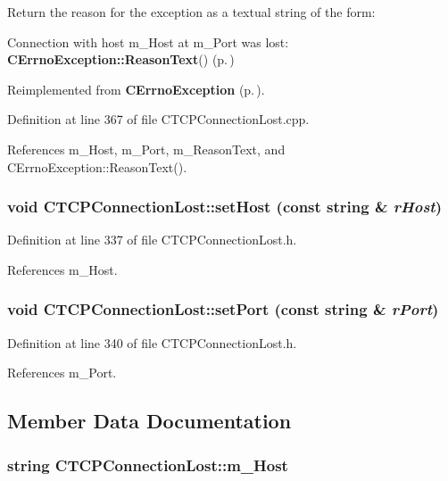 Return the reason for the exception as a textual string of the form:

Connection with host m\_\-Host at m\_\-Port was lost: {\bf CErrno\-Exception::Reason\-Text}() {\rm (p.\,\pageref{classCErrnoException_a7})} 

Reimplemented from {\bf CErrno\-Exception} {\rm (p.\,\pageref{classCErrnoException_a7})}.

Definition at line 367 of file CTCPConnection\-Lost.cpp.

References m\_\-Host, m\_\-Port, m\_\-Reason\-Text, and CErrno\-Exception::Reason\-Text().
\subsubsection{\setlength{\rightskip}{0pt plus 5cm}void CTCPConnection\-Lost::set\-Host (const string \& {\em r\-Host})\hspace{0.3cm}{\tt  [inline, protected]}}\label{classCTCPConnectionLost_b0}




Definition at line 337 of file CTCPConnection\-Lost.h.

References m\_\-Host.
\subsubsection{\setlength{\rightskip}{0pt plus 5cm}void CTCPConnection\-Lost::set\-Port (const string \& {\em r\-Port})\hspace{0.3cm}{\tt  [inline, protected]}}\label{classCTCPConnectionLost_b1}




Definition at line 340 of file CTCPConnection\-Lost.h.

References m\_\-Port.

\subsection{Member Data Documentation}
\subsubsection{\setlength{\rightskip}{0pt plus 5cm}string CTCPConnection\-Lost::m\_\-Host\hspace{0.3cm}{\tt  [private]}}\label{classCTCPConnectionLost_o0}




